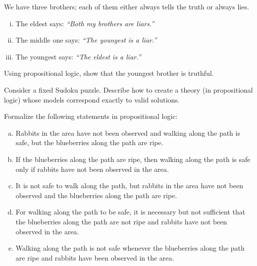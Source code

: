 \begin{problem}

    We have three brothers; each of them either always tells the truth or always lies.
    \begin{enumerate}[(i)]
        \item The eldest says: \emph{``Both my brothers are liars.''}
        \item The middle one says: \emph{``The youngest is a liar.''}
        \item The youngest says: \emph{``The eldest is a liar.''}
    \end{enumerate}
    Using propositional logic, show that the youngest brother is truthful.
     
\end{problem}


\begin{problem}

    Consider a fixed Sudoku puzzle. Describe how to create a theory (in propositional logic) whose models correspond exactly to valid solutions.
    
\end{problem}


\begin{problem}

    Formalize the following statements in propositional logic:
    \begin{enumerate}[(a)]\it

        \item Rabbits in the area have not been observed and walking along the path is safe, but the blueberries along the path are ripe.
        
        \item If the blueberries along the path are ripe, then walking along the path is safe only if rabbits have not been observed in the area.
        
        \item It is not safe to walk along the path, but rabbits in the area have not been observed and the blueberries along the path are ripe.
        
        \item For walking along the path to be safe, it is necessary but not sufficient that the blueberries along the path are not ripe and rabbits have not been observed in the area.
        
        \item Walking along the path is not safe whenever the blueberries along the path are ripe and rabbits have been observed in the area.
    
    \end{enumerate}
    
\end{problem}


